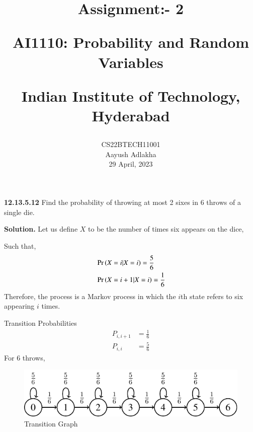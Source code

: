 \documentclass[journal,12pt,twocolumn]{IEEEtran}
\begin{document}
\let\vec\mathbf


\vspace{3cm}

\title{
	Assignment:- 2
 
	\Large AI1110: Probability and Random Variables
 
	\Large Indian Institute of Technology, Hyderabad
}
\author{
	CS22BTECH11001
	
	Aayush Adlakha
 
	29 April, 2023
}






\maketitle

\newpage


\bigskip
\renewcommand{\thefigure}{\theenumi}
\renewcommand{\thetable}{\theenumi}
\textbf{12.13.5.12}
Find the probability of throwing at most 2 sixes in 6 throws of a single die.

\textbf{Solution.}
Let us define $X$ to be the number of times six appears on the dice,

Such that, 
\begin{align}
&\Pr\left(X = i | X = i\right) = \frac{5}{6}\\
&\Pr\left(X = i + 1 | X = i\right) = \frac{1}{6}
\end{align}
Therefore,
the process is a Markov process in which the $i$th state refers to six appearing $i$ times.

Transition Probabilities 
\begin{align}
    P_{i,i+1} &= \frac{1}{6}\\
    P_{i,i} &=\frac{5}{6}
\end{align}
For 6 throws,
\begin{figure}[h!]
    \centering
    \includegraphics[width=\columnwidth]{figs/output-figure0}
    \caption{Transition Graph}
    \label{fig:my_label}
\end{figure}
\end{document}
